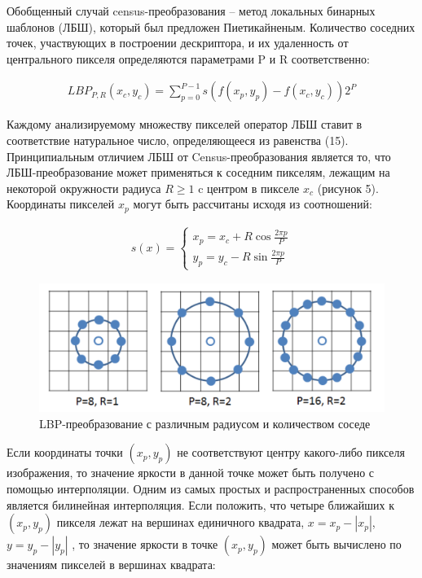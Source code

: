 Обобщенный случай census-преобразования -- метод локальных бинарных шаблонов (ЛБШ), который был предложен Пиетикайненым. Количество соседних  точек,  участвующих  в  построении  дескриптора,  и  их  удаленность  от центрального пикселя определяются параметрами P и R соответственно:

\begin{gather}
LBP_{P,R}(x_c, y_c) =  \sum\limits_{p=0}^{P-1}s(f(x_p, y_p)-f(x_c, y_c))2^P
\end{gather}

Каждому  анализируемому  множеству  пикселей  оператор ЛБШ ставит  в соответствие   натуральное   число,   определяющееся   из   равенства (15). Принципиальным отличием ЛБШ от Census-преобразования является то, что ЛБШ-преобразование может применяться к соседним пикселям, лежащим на некоторой окружности  радиуса $R \ge 1$ c центром  в  пикселе $x_c$ (рисунок 5).  Координаты пикселей $x_p$ могут быть рассчитаны исходя из соотношений:

\begin{gather}
s(x) =
  \begin{cases}
    x_p=x_c + R \cos \frac{2 \pi p}{P} \\
    y_p=y_c - R \sin \frac{2 \pi p}{P}
 \end{cases}
\end{gather}

\begin{figure}[h!]
\centering
\includegraphics[scale=0.33]{res/pic005}
\caption{LBP-преобразование с различным радиусом и количеством соседе}
\end{figure}

Если  координаты  точки $(x_p, y_p)$ не  соответствуют  центру  какого-либо пикселя изображения, то значение яркости в данной точке может быть получено с помощью интерполяции. Одним из самых простых и распространенных способов является  билинейная  интерполяция.  Если  положить,  что  четыре  ближайших  к $(x_p, y_p)$ пикселя лежат на вершинах единичного квадрата, $x = x_p - | x_p |$, $y = y_p - | y_p |$ , то значение яркости в точке $(x_p, y_p)$ может быть вычислено по значениям пикселей в вершинах квадрата:

